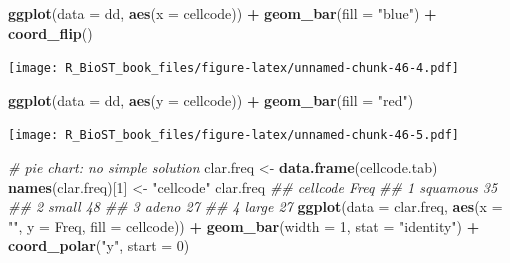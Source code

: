\documentclass[
]{book}
\newenvironment{Shaded}{\begin{snugshade}}{\end{snugshade}}
\newcommand{\CommentTok}[1]{\textcolor[rgb]{0.56,0.35,0.01}{\textit{#1}}}
\newcommand{\DataTypeTok}[1]{\textcolor[rgb]{0.13,0.29,0.53}{#1}}
\newcommand{\DecValTok}[1]{\textcolor[rgb]{0.00,0.00,0.81}{#1}}
\newcommand{\KeywordTok}[1]{\textcolor[rgb]{0.13,0.29,0.53}{\textbf{#1}}}
\newcommand{\NormalTok}[1]{#1}
\newcommand{\OperatorTok}[1]{\textcolor[rgb]{0.81,0.36,0.00}{\textbf{#1}}}
\newcommand{\StringTok}[1]{\textcolor[rgb]{0.31,0.60,0.02}{#1}}
\begin{document}
\begin{Shaded}
\begin{Highlighting}[]
\KeywordTok{ggplot}\NormalTok{(}\DataTypeTok{data =}\NormalTok{ dd, }\KeywordTok{aes}\NormalTok{(}\DataTypeTok{x =}\NormalTok{ cellcode)) }\OperatorTok{+}
\StringTok{  }\KeywordTok{geom\_bar}\NormalTok{(}\DataTypeTok{fill =} \StringTok{"blue"}\NormalTok{) }\OperatorTok{+}\StringTok{ }
\StringTok{  }\KeywordTok{coord\_flip}\NormalTok{()}
\end{Highlighting}
\end{Shaded}

\texttt{[image: R\_BioST\_book\_files/figure-latex/unnamed-chunk-46-4.pdf]}

\begin{Shaded}
\begin{Highlighting}[]
\KeywordTok{ggplot}\NormalTok{(}\DataTypeTok{data =}\NormalTok{ dd, }\KeywordTok{aes}\NormalTok{(}\DataTypeTok{y =}\NormalTok{ cellcode)) }\OperatorTok{+}
\StringTok{  }\KeywordTok{geom\_bar}\NormalTok{(}\DataTypeTok{fill =} \StringTok{"red"}\NormalTok{) }
\end{Highlighting}
\end{Shaded}

\texttt{[image: R\_BioST\_book\_files/figure-latex/unnamed-chunk-46-5.pdf]}

\begin{Shaded}
\begin{Highlighting}[]
\CommentTok{\# pie chart: no simple solution}
\NormalTok{clar.freq \textless{}{-}}\StringTok{ }\KeywordTok{data.frame}\NormalTok{(cellcode.tab)}
\KeywordTok{names}\NormalTok{(clar.freq)[}\DecValTok{1}\NormalTok{] \textless{}{-}}\StringTok{ "cellcode"}
\NormalTok{clar.freq}
\CommentTok{\#\#   cellcode Freq}
\CommentTok{\#\# 1 squamous   35}
\CommentTok{\#\# 2    small   48}
\CommentTok{\#\# 3    adeno   27}
\CommentTok{\#\# 4    large   27}
\KeywordTok{ggplot}\NormalTok{(}\DataTypeTok{data =}\NormalTok{ clar.freq, }\KeywordTok{aes}\NormalTok{(}\DataTypeTok{x =} \StringTok{""}\NormalTok{, }\DataTypeTok{y =}\NormalTok{ Freq, }\DataTypeTok{fill =}\NormalTok{ cellcode)) }\OperatorTok{+}
\StringTok{  }\KeywordTok{geom\_bar}\NormalTok{(}\DataTypeTok{width =} \DecValTok{1}\NormalTok{, }\DataTypeTok{stat =} \StringTok{"identity"}\NormalTok{) }\OperatorTok{+}\StringTok{ }
\StringTok{  }\KeywordTok{coord\_polar}\NormalTok{(}\StringTok{"y"}\NormalTok{, }\DataTypeTok{start =} \DecValTok{0}\NormalTok{)}
\end{Highlighting}
\end{Shaded}
\end{document}
